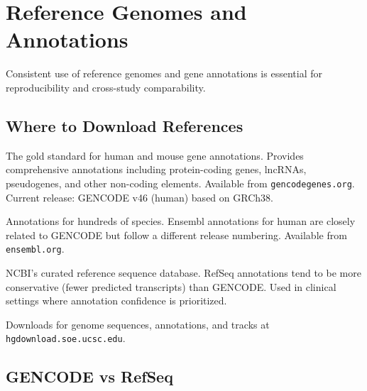 \section{Reference Genomes and Annotations}
\label{sec:datastandards:references}

Consistent use of reference genomes and gene annotations is essential for reproducibility and cross-study comparability.

\subsection{Where to Download References}

\begin{description}[style=nextline, font=\bfseries, itemsep=3pt]
  \item[GENCODE]
  The gold standard for human and mouse gene annotations. Provides comprehensive annotations including protein-coding genes, lncRNAs, pseudogenes, and other non-coding elements. Available from \texttt{gencodegenes.org}. Current release: GENCODE v46 (human) based on GRCh38.

  \item[Ensembl]
  Annotations for hundreds of species. Ensembl annotations for human are closely related to GENCODE but follow a different release numbering. Available from \texttt{ensembl.org}.

  \item[RefSeq (NCBI)]
  NCBI's curated reference sequence database. RefSeq annotations tend to be more conservative (fewer predicted transcripts) than GENCODE. Used in clinical settings where annotation confidence is prioritized.

  \item[UCSC Genome Browser]
  Downloads for genome sequences, annotations, and tracks at \texttt{hgdownload.soe.ucsc.edu}.
\end{description}

\subsection{GENCODE vs RefSeq}

